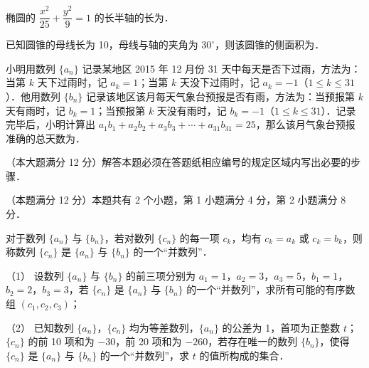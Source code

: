 \begin{question}
椭圆的 \(\dfrac{x^{2}}{25}+\dfrac{y^{2}}{9}=1\) 的长半轴的长为\gkblank{}．

\end{question}
\begin{question}
已知圆锥的母线长为 10，母线与轴的夹角为 \(30^{\circ}\)，则该圆锥的侧面积为\gkblank{}．

\end{question}
\begin{question}
小明用数列 \(\{a_{n}\}\) 记录某地区 2015 年 12 月份 31 天中每天是否下过雨，方法为：当第 \(k\) 天下过雨时，记 \(a_{k}=1\)；当第 \(k\) 天没下过雨时，记 \(a_{k}=-1\)（\(1\leqslant k\leqslant 31\)）．他用数列 \(\{b_{n}\}\) 记录该地区该月每天气象台预报是否有雨，方法为：当预报第 \(k\) 天有雨时，记 \(b_{k}=1\)；当预报第 \(k\) 天没有雨时，记 \(b_{k}=-1\)（\(1\leqslant k\leqslant 31\)）．记录完毕后，小明计算出 \(a_{1}b_{1}+a_{2}b_{2}+a_{3}b_{3}+\cdots+a_{31}b_{31}=25\)，那么该月气象台预报准确的总天数为\gkblank{}．

\end{question}

（本大题满分 12 分）解答本题必须在答题纸相应编号的规定区域内写出必要的步骤．

\begin{question}
（本题满分 12 分）本题共有 2 个小题，第 1 小题满分 4 分，第 2 小题满分 8 分．

对于数列 \(\{a_{n}\}\) 与 \(\{b_{n}\}\)，若对数列 \(\{c_{n}\}\) 的每一项 \(c_{k}\)，均有 \(c_{k}=a_{k}\) 或 \(c_{k}=b_{k}\)，则称数列 \(\{c_{n}\}\) 是 \(\{a_{n}\}\) 与 \(\{b_{n}\}\) 的一个“并数列”．

（1） 设数列 \(\{a_{n}\}\) 与 \(\{b_{n}\}\) 的前三项分别为 \(a_{1}=1\)，\(a_{2}=3\)，\(a_{3}=5\)，\(b_{1}=1\)，\(b_{2}=2\)，\(b_{3}=3\)，若 \(\{c_{n}\}\) 是 \(\{a_{n}\}\) 与 \(\{b_{n}\}\) 的一个“并数列”，求所有可能的有序数组 \((c_{1},c_{2},c_{3})\)；

（2） 已知数列 \(\{a_{n}\}\)，\(\{c_{n}\}\) 均为等差数列，\(\{a_{n}\}\) 的公差为 1，首项为正整数 \(t\)；\(\{c_{n}\}\) 的前 10 项和为 \(-30\)，前 20 项和为 \(-260\)，若存在唯一的数列 \(\{b_{n}\}\)，使得 \(\{c_{n}\}\) 是 \(\{a_{n}\}\) 与 \(\{b_{n}\}\) 的一个“并数列”，求 \(t\) 的值所构成的集合．

\end{question}